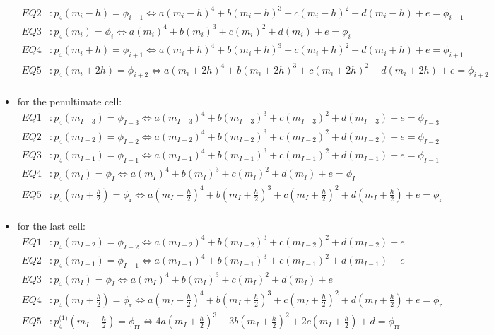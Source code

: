 \documentclass[12pt,a4paper]{article}
\newcommand{\phir}{\phi_\text{r}}
\newcommand{\phirr}{\phi_{\text{rr}}}
\begin{document}
\begin{itemize}
\begin{align*}
EQ2&:p_4\left(m_i-h\right)=\phi_{i-1}\Leftrightarrow a\left(m_i-h\right)^4+b\left(m_i-h\right)^3+c\left(m_i-h\right)^2+d\left(m_i-h\right)+e=\phi_{i-1}\\
EQ3&:p_4\left(m_i\right)=\phi_{i}\Leftrightarrow a\left(m_i\right)^4+b\left(m_i\right)^3+c\left(m_i\right)^2+d\left(m_i\right)+e=\phi_{i}\\
EQ4&:p_4\left(m_i+h\right)=\phi_{i+1}\Leftrightarrow a\left(m_i+h\right)^4+b\left(m_i+h\right)^3+c\left(m_i+h\right)^2+d\left(m_i+h\right)+e=\phi_{i+1}\\
EQ5&:p_4\left(m_i+2h\right)=\phi_{i+2}\Leftrightarrow a\left(m_i+2h\right)^4+b\left(m_i+2h\right)^3+c\left(m_i+2h\right)^2+d\left(m_i+2h\right)+e=\phi_{i+2}\\
\end{align*}
%
\item for the penultimate cell:
\begin{align*}
EQ1&:p_4\left(m_{I-3}\right)=\phi_{I-3}\Leftrightarrow a\left(m_{I-3}\right)^4+b\left(m_{I-3}\right)^3+c\left(m_{I-3}\right)^2+d\left(m_{I-3}\right)+e=\phi_{I-3}\\
EQ2&:p_4\left(m_{I-2}\right)=\phi_{I-2}\Leftrightarrow a\left(m_{I-2}\right)^4+b\left(m_{I-2}\right)^3+c\left(m_{I-2}\right)^2+d\left(m_{I-2}\right)+e=\phi_{I-2}\\
EQ3&:p_4\left(m_{I-1}\right)=\phi_{I-1}\Leftrightarrow a\left(m_{I-1}\right)^4+b\left(m_{I-1}\right)^3+c\left(m_{I-1}\right)^2+d\left(m_{I-1}\right)+e=\phi_{I-1}\\
EQ4&:p_4\left(m_{I}\right)=\phi_{I}\Leftrightarrow a\left(m_{I}\right)^4+b\left(m_{I}\right)^3+c\left(m_{I}\right)^2+d\left(m_{I}\right)+e=\phi_{I}\\
EQ5&:p_4\left(m_{I}+\frac{h}{2}\right)=\phir\Leftrightarrow a\left(m_{I}+\frac{h}{2}\right)^4+b\left(m_{I}+\frac{h}{2}\right)^3+c\left(m_{I}+\frac{h}{2}\right)^2+d\left(m_{I}+\frac{h}{2}\right)+e=\phir\\
\end{align*}
%
\item for the last cell:
\begin{align*}
EQ1&:p_4\left(m_{I-2}\right)=\phi_{I-2}\Leftrightarrow a\left(m_{I-2}\right)^4+b\left(m_{I-2}\right)^3+c\left(m_{I-2}\right)^2+d\left(m_{I-2}\right)+e\\
EQ2&:p_4\left(m_{I-1}\right)=\phi_{I-1}\Leftrightarrow a\left(m_{I-1}\right)^4+b\left(m_{I-1}\right)^3+c\left(m_{I-1}\right)^2+d\left(m_{I-1}\right)+e\\
EQ3&:p_4\left(m_{I}\right)=\phi_{I}\Leftrightarrow a\left(m_{I}\right)^4+b\left(m_{I}\right)^3+c\left(m_{I}\right)^2+d\left(m_{I}\right)+e\\
EQ4&:p_4\left(m_{I}+\frac{h}{2}\right)=\phir\Leftrightarrow a\left(m_{I}+\frac{h}{2}\right)^4+b\left(m_{I}+\frac{h}{2}\right)^3+c\left(m_{I}+\frac{h}{2}\right)^2+d\left(m_{I}+\frac{h}{2}\right)+e=\phir\\
EQ5&:p_4^{\text{(1)}}\left(m_{I}+\frac{h}{2}\right)=\phirr\Leftrightarrow 4a\left(m_{I}+\frac{h}{2}\right)^3+3b\left(m_{I}+\frac{h}{2}\right)^2+2c\left(m_{I}+\frac{h}{2}\right)+d=\phirr\\
\end{align*}
\end{itemize}
\end{document}
